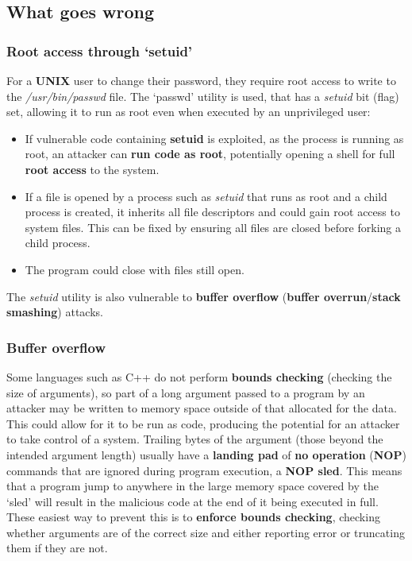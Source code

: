 \documentclass{article}
\begin{document}
\pagebreak

\subsection{What goes wrong}

\subsubsection{Root access through `setuid'}
For a \textbf{UNIX} user to change their password, they require root access to write to the \textit{/usr/bin/passwd} file. The `passwd' utility is used, that has a \textit{setuid} bit (flag) set, allowing it to run as root even when executed by an unprivileged user:
\begin{itemize}
	\item If vulnerable code containing \textbf{setuid} is exploited, as the process is running as root, an attacker can \textbf{run code as root}, potentially opening a shell for full \textbf{root access} to the system.
	\item If a file is opened by a process such as \textit{setuid} that runs as root and a child process is created, it inherits all file descriptors and could gain root access to system files. This can be fixed by ensuring all files are closed before forking a child process.
	\item The program could close with files still open. 
\end{itemize}
The \textit{setuid} utility is also vulnerable to \textbf{buffer overflow} (\textbf{buffer overrun}/\textbf{stack smashing}) attacks.

\subsubsection{Buffer overflow}
Some languages such as C++ do not perform \textbf{bounds checking} (checking the size of arguments), so part of a long argument passed to a program by an attacker may be written to memory space outside of that allocated for the data. This could allow for it to be run as code, producing the potential for an attacker to take control of a system. Trailing bytes of the argument (those beyond the intended argument length) usually have a \textbf{landing pad} of \textbf{no operation} (\textbf{NOP}) commands that are ignored during program execution, a \textbf{NOP sled}. This means that a program jump to anywhere in the large memory space covered by the `sled' will result in the malicious code at the end of it being executed in full. These easiest way to prevent this is to \textbf{enforce bounds checking}, checking whether arguments are of the correct size and either reporting error or truncating them if they are not.
\end{document}
